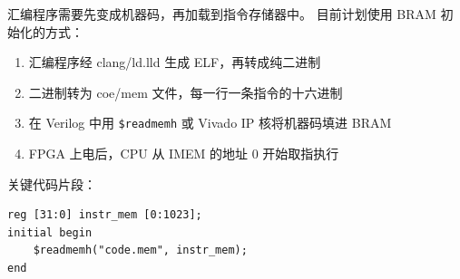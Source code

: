 
汇编程序需要先变成机器码，再加载到指令存储器中。
目前计划使用 BRAM 初始化的方式：

\begin{enumerate}
    \item 汇编程序经 clang/ld.lld 生成 ELF，再转成纯二进制
    \item 二进制转为 coe/mem 文件，每一行一条指令的十六进制
    \item 在 Verilog 中用 \texttt{\$readmemh} 或 Vivado IP 核将机器码填进 BRAM
    \item FPGA 上电后，CPU 从 IMEM 的地址 0 开始取指执行
\end{enumerate}

关键代码片段：

\begin{verbatim}
reg [31:0] instr_mem [0:1023];
initial begin
    $readmemh("code.mem", instr_mem);
end
\end{verbatim}
